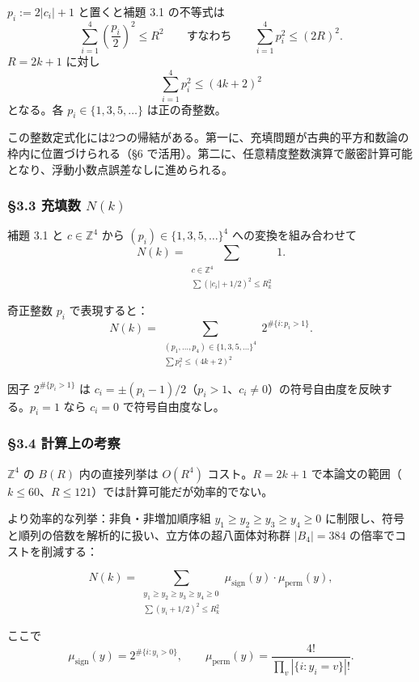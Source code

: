 \documentclass[a4paper,11pt]{ltjsarticle}
\theoremstyle{definition}
\begin{document}
\(p_i := 2|c_i| + 1\) と置くと補題 3.1 の不等式は
\[\sum_{i=1}^{4} \left(\frac{p_i}{2}\right)^2 \le R^2 \qquad \text{すなわち} \qquad \sum_{i=1}^{4} p_i^2 \le (2R)^2.\]
\(R = 2k+1\) に対し \[\sum_{i=1}^{4} p_i^2 \le (4k+2)^2\] となる。各
\(p_i \in \{1, 3, 5, \ldots\}\) は正の奇整数。

この整数定式化には2つの帰結がある。第一に、充填問題が古典的平方和数論の枠内に位置づけられる（§6
で活用）。第二に、任意精度整数演算で厳密計算可能となり、浮動小数点誤差なしに進められる。

\subsubsection{\texorpdfstring{§3.3 充填数
\(N(k)\)}{§3.3 充填数 N(k)}}\label{ux5145ux586bux6570-nk}

補題 3.1 と \(c \in \mathbb{Z}^4\) から
\((p_i) \in \{1, 3, 5, \ldots\}^4\) への変換を組み合わせて
\[N(k) = \sum_{\substack{c \in \mathbb{Z}^4 \\ \sum (|c_i| + 1/2)^2 \le R_k^2}} 1.\]

奇正整数 \(p_i\) で表現すると：
\[N(k) = \sum_{\substack{(p_1, \ldots, p_4) \in \{1,3,5,\ldots\}^4 \\ \sum p_i^2 \le (4k+2)^2}} 2^{\#\{i : p_i > 1\}}.\]

因子 \(2^{\#\{p_i > 1\}}\) は
\(c_i = \pm (p_i - 1)/2\)（\(p_i > 1\)、\(c_i \neq 0\)）の符号自由度を反映する。\(p_i = 1\)
なら \(c_i = 0\) で符号自由度なし。

\subsubsection{§3.4
計算上の考察}\label{ux8a08ux7b97ux4e0aux306eux8003ux5bdf}

\(\mathbb{Z}^4\) の \(B(R)\) 内の直接列挙は \(O(R^4)\)
コスト。\(R = 2k+1\)
で本論文の範囲（\(k \le 60\)、\(R \le 121\)）では計算可能だが効率的でない。

より効率的な列挙：非負・非増加順序組
\(y_1 \ge y_2 \ge y_3 \ge y_4 \ge 0\)
に制限し、符号と順列の倍数を解析的に扱い、立方体の超八面体対称群
\(|B_4| = 384\) の倍率でコストを削減する：

\[N(k) = \sum_{\substack{y_1 \ge y_2 \ge y_3 \ge y_4 \ge 0 \\ \sum (y_i + 1/2)^2 \le R_k^2}} \mu_{\mathrm{sign}}(y) \cdot \mu_{\mathrm{perm}}(y),\]

ここで
\[\mu_{\mathrm{sign}}(y) = 2^{\#\{i : y_i > 0\}}, \qquad \mu_{\mathrm{perm}}(y) = \frac{4!}{\prod_v |\{i : y_i = v\}|!}.\]
\end{document}
